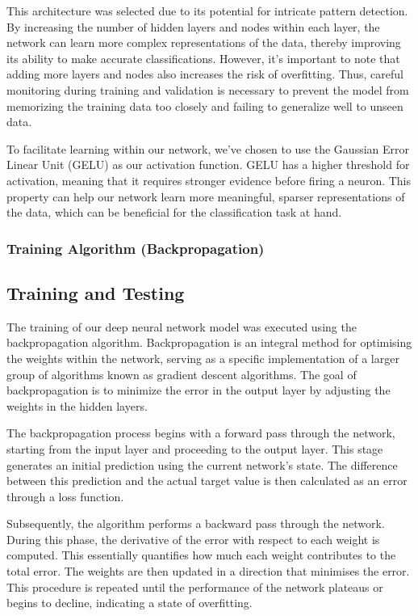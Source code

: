 \documentclass[conference]{inc/IEEEtran}
\begin{document}
This architecture was selected due to its potential for intricate pattern detection. By increasing the number of hidden layers and nodes within each
layer, the network can learn more complex representations of the data, thereby improving its ability to make accurate classifications. However, it's
important to note that adding more layers and nodes also increases the risk of overfitting. Thus, careful monitoring during training and validation
is necessary to prevent the model from memorizing the training data too closely and failing to generalize well to unseen data.

To facilitate learning within our network, we've chosen to use the Gaussian Error Linear Unit (GELU) as our activation function. GELU has a higher
threshold for activation, meaning that it requires stronger evidence before firing a neuron. This property can help our network learn more meaningful,
sparser representations of the data, which can be beneficial for the classification task at hand.

\subsubsection{Training Algorithm (Backpropagation)}

\subsection{Training and Testing}

The training of our deep neural network model was executed using the backpropagation algorithm. Backpropagation is an integral method for optimising
the weights within the network, serving as a specific implementation of a larger group of algorithms known as gradient descent algorithms. The goal
of backpropagation is to minimize the error in the output layer by adjusting the weights in the hidden layers.

The backpropagation process begins with a forward pass through the network, starting from the input layer and proceeding to the output layer. This
stage generates an initial prediction using the current network's state. The difference between this prediction and the actual target value is then
calculated as an error through a loss function.

Subsequently, the algorithm performs a backward pass through the network. During this phase, the derivative of the error with respect to each weight
is computed. This essentially quantifies how much each weight contributes to the total error. The weights are then updated in a direction that
minimises the error. This procedure is repeated until the performance of the network plateaus or begins to decline, indicating a state of overfitting.
\end{document}
